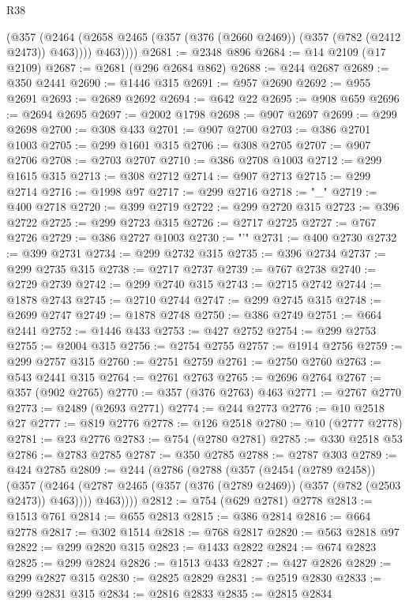 \begin{lexlean}{R38}
\begin{coremodule}
          (@357
            (@2464 (@2658 @2465 (@357 (@376 (@2660 @2469)) (@357 (@782 (@2412 @2473)) @463))))
            @463))))
@2681 := @2348 @896
@2684 := @14 @2109 (@17 @2109)
@2687 := @2681 (@296 @2684 @862)
@2688 := @244 @2687
@2689 := @350 @2441
@2690 := @1446 @315
@2691 := @957 @2690
@2692 := @955 @2691
@2693 := @2689 @2692
@2694 := @642 @22
@2695 := @908 @659
@2696 := @2694 @2695
@2697 := @2002 @1798
@2698 := @907 @2697
@2699 := @299 @2698
@2700 := @308 @433
@2701 := @907 @2700
@2703 := @386 @2701 @1003
@2705 := @299 @1601 @315
@2706 := @308 @2705
@2707 := @907 @2706
@2708 := @2703 @2707
@2710 := @386 @2708 @1003
@2712 := @299 @1615 @315
@2713 := @308 @2712
@2714 := @907 @2713
@2715 := @299 @2714
@2716 := @1998 @97
@2717 := @299 @2716
@2718 := "_"
@2719 := @400 @2718
@2720 := @399 @2719
@2722 := @299 @2720 @315
@2723 := @396 @2722
@2725 := @299 @2723 @315
@2726 := @2717 @2725
@2727 := @767 @2726
@2729 := @386 @2727 @1003
@2730 := "'"
@2731 := @400 @2730
@2732 := @399 @2731
@2734 := @299 @2732 @315
@2735 := @396 @2734
@2737 := @299 @2735 @315
@2738 := @2717 @2737
@2739 := @767 @2738
@2740 := @2729 @2739
@2742 := @299 @2740 @315
@2743 := @2715 @2742
@2744 := @1878 @2743
@2745 := @2710 @2744
@2747 := @299 @2745 @315
@2748 := @2699 @2747
@2749 := @1878 @2748
@2750 := @386 @2749
@2751 := @664 @2441
@2752 := @1446 @433
@2753 := @427 @2752
@2754 := @299 @2753
@2755 := @2004 @315
@2756 := @2754 @2755
@2757 := @1914 @2756
@2759 := @299 @2757 @315
@2760 := @2751 @2759
@2761 := @2750 @2760
@2763 := @543 @2441 @315
@2764 := @2761 @2763
@2765 := @2696 @2764
@2767 := @357 (@902 @2765)
@2770 := @357 (@376 @2763) @463
@2771 := @2767 @2770
@2773 := @2489 (@2693 @2771)
@2774 := @244 @2773
@2776 := @10 @2518 @27
@2777 := @819 @2776
@2778 := @126 @2518
@2780 := @10 (@2777 @2778)
@2781 := @23 @2776
@2783 := @754 (@2780 @2781)
@2785 := @330 @2518 @53
@2786 := @2783 @2785
@2787 := @350 @2785
@2788 := @2787 @303
@2789 := @424 @2785
@2809 := @244
    (@2786
      (@2788
        (@357
          (@2454 (@2789 @2458))
          (@357
            (@2464 (@2787 @2465 (@357 (@376 (@2789 @2469)) (@357 (@782 (@2503 @2473)) @463))))
            @463))))
@2812 := @754 (@629 @2781) @2778
@2813 := @1513 @761
@2814 := @655 @2813
@2815 := @386 @2814
@2816 := @664 @2778
@2817 := @302 @1514
@2818 := @768 @2817
@2820 := @563 @2818 @97
@2822 := @299 @2820 @315
@2823 := @1433 @2822
@2824 := @674 @2823
@2825 := @299 @2824
@2826 := @1513 @433
@2827 := @427 @2826
@2829 := @299 @2827 @315
@2830 := @2825 @2829
@2831 := @2519 @2830
@2833 := @299 @2831 @315
@2834 := @2816 @2833
@2835 := @2815 @2834

\end{coremodule}
\end{lexlean}
